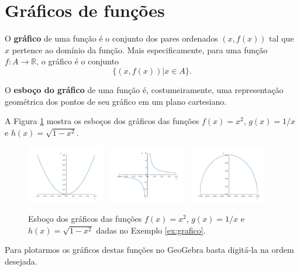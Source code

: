 \documentclass[../main.tex]{subfiles}
\begin{document}
\section{Gráficos de funções}\label{sec:GrafFunc}
O \textbf{gráfico} de uma função é o conjunto dos pares ordenados $(x, f(x))$ tal que $x$ pertence ao domínio da função. Mais especificamente, para uma função $f:A\to \mathbb{R}$, o gráfico é o conjunto
\begin{equation}
  \{(x, f(x))| x\in A\}.
\end{equation}

O \textbf{esboço do gráfico} de uma função é, costumeiramente, uma representação geométrica dos pontos de seu gráfico em um plano cartesiano.

\begin{ex}\label{ex:grafico}
  A Figura \ref{fig:ex_grafico} mostra os esboços dos gráficos das funções $f(x)=x^2$, $g(x)=1/x$ e $h(x)=\sqrt{1-x^2}$.
  
  \begin{figure}[H]
    \centering
    \includegraphics[width=0.3\textwidth]{fig_func/fig_ex_grafico_x2}~
    \includegraphics[width=0.3\textwidth]{fig_func/fig_ex_grafico_1x}~
    \includegraphics[width=0.3\textwidth]{fig_func/fig_ex_grafico_s1x2}
    \caption{Esboço dos gráficos das funções $f(x)=x^2$, $g(x)=1/x$ e $h(x)=\sqrt{1-x^2}$ dadas no Exemplo \ref{ex:grafico}.}
    \label{fig:ex_grafico}
  \end{figure}

  
 
 \dica Para plotarmos os gráficos destas funções no GeoGebra basta digitá-la na ordem desejada.
\end{ex}
\end{document}
